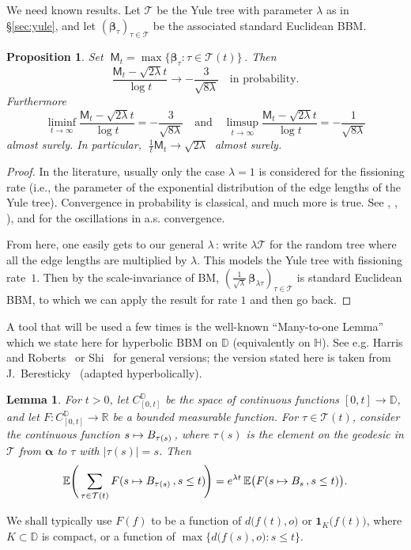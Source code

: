 \documentclass[12pt]{amsart}
\newcommand\AND{\quad\text{and}\quad}
\newcommand\bal{\boldsymbol{\alpha}}
\newcommand\BB{\textit{\textbf{B}}}
\newcommand\E{\mathbb E}
\newcommand\DD{\mathbb D}
\newcommand\HH{\mathbb H}
\newcommand\R{\mathbb R}
\newcommand\ro{d}
\newcommand\T{\mathcal T}
\newcommand\uno{\mathbf 1}
\numberwithin{theorem}{section}
\newtheorem{pro}[theorem]{Proposition}%
\newtheorem{lem}[theorem]{Lemma}%
\theoremstyle{definition}
\begin{document}
We need known results. 
Let $\T$ be the Yule tree with parameter $\lambda$ as in \S \ref{sec:yule}, and let 
$(\boldsymbol{\beta}_{\tau})_{\tau \in \T}$ be the associated standard Euclidean BBM.

\begin{pro}\label{pro:Euc}
Set $\;
\mathsf{M}_t = \max \bigl\{ \boldsymbol{\beta}_{\tau} : \tau \in \T(t) \bigr\}\,$.
Then 
$$
\frac{\mathsf{M}_t - \sqrt{2\lambda}t}{\log t} \to - \frac{3}{\sqrt{8\lambda}}
\quad \text{in probability.}
$$
Furthermore
$$
\liminf_{t \to \infty} \frac{\mathsf{M}_t - \sqrt{2\lambda}t}{\log t} 
= - \frac{3}{\sqrt{8\lambda}}
\AND 
\limsup_{t \to \infty} \frac{\mathsf{M}_t - \sqrt{2\lambda}t}{\log t} = - \frac{1}{\sqrt{8\lambda}}
$$
almost surely. In particular, $\; \frac{1}{t}\mathsf{M}_t \to \sqrt{2\lambda}\;$ almost surely.
\end{pro}

\begin{proof} In the literature,  usually only the case $\lambda =1$ is considered for
the fissioning rate (i.e., the parameter of the exponential distribution of the 
edge lengths of the Yule tree). Convergence in probability is classical, and much more is
true. See
\cite{McK}, \cite{Br}, \cite[\S 3]{Bo}), and \cite[Thm. 2]{Ro} for the oscillations 
in a.s. convergence.

From here, one easily gets to our general $\lambda\,$: write $\lambda \T$ for the random tree 
where all the edge lengths are multiplied by $\lambda$.
This models the Yule tree with fissioning rate~$1$. 
Then by the scale-invariance of BM, 
$(\frac{1}{\sqrt{\lambda}}\,\boldsymbol{\beta}_{\lambda\tau})_{\tau \in \T}$
is standard Euclidean BBM, to which we can apply the result for rate $1$ and then go back. 
\end{proof}

A tool that will be used a few times is the well-known ``Many-to-one Lemma'' which we state here 
for hyperbolic BBM on $\DD$ (equivalently on $\HH$). 
See e.g. {\sc Harris and Roberts}~\cite{HaRo} or {\sc Shi}~\cite{Shi} for general versions;
the version stated here is taken from {\sc J.~Beresticky}~\cite{Ber} (adapted hyperbolically).

\begin{lem}\label{lem:many-one} For $t > 0$, let $C_{[0,t]}^{\DD}$ be the space of continuous
functions $[0,t] \to \DD$, and 
let $F: C_{[0,t]}^{\DD} \to \R$ be a bounded measurable function. For $\tau \in \T(t)$, 
consider the continuous function $s \mapsto \BB_{\tau(s)}\,$, where $\tau(s)$ is the element on
the geodesic in $\T$ from $\bal$ to $\tau$ with $|\tau(s)|=s$.
Then
$$
\E \Biggl(\, \sum_{\tau \in \T(t)} F(s \mapsto \BB_{\tau(s)}\,, s \le t)\! \Biggr) = 
e^{\lambda t} \, \E \bigl(F(s \mapsto B_s\,, s \le t)\bigr).
$$
\end{lem}
We shall typically use $F(f)$ to be a function of $\ro\bigl(f(t),o\bigr)$
or $\uno_K\bigl(f(t)\bigr)$, where $K \subset \DD$ is compact, or a function of 
$\max \bigl\{ \ro\bigl(f(s),o\bigr) :  s \le t \}$.
\end{document}
